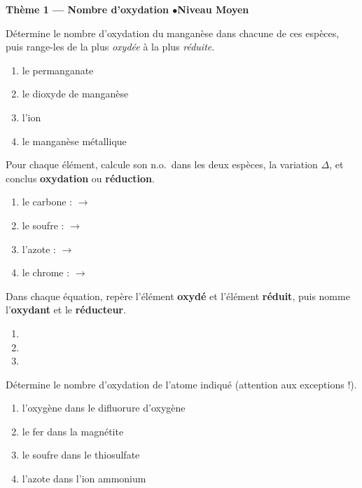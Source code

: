 \documentclass[11pt,a4paper]{article}
\begin{document}
\begin{center}\color{primarydark}\large\bfseries Thème 1 — Nombre d'oxydation \quad$\bullet$\quad Niveau Moyen\end{center}

\begin{exo}
Détermine le nombre d'oxydation du manganèse dans chacune de ces espèces, puis range-les de la plus
\emph{oxydée} à la plus \emph{réduite}.
\begin{enumerate}[label=\alph*)]
  \item le permanganate 
  \item le dioxyde de manganèse 
  \item l'ion 
  \item le manganèse métallique 
\end{enumerate}
\end{exo}

\begin{exo}
Pour chaque élément, calcule son n.o.\ dans les deux espèces, la variation $\Delta$, et conclus
\textbf{oxydation} ou \textbf{réduction}.
\begin{enumerate}[label=\alph*)]
  \item le carbone :  $\longrightarrow$ 
  \item le soufre :  $\longrightarrow$ 
  \item l'azote :  $\longrightarrow$ 
  \item le chrome :  $\longrightarrow$ 
\end{enumerate}
\end{exo}

\begin{exo}
Dans chaque équation, repère l'élément \textbf{oxydé} et l'élément \textbf{réduit}, puis nomme
l'\textbf{oxydant} et le \textbf{réducteur}.
\begin{enumerate}[label=\alph*)]
  \item {}
  \item {}
  \item {}
\end{enumerate}
\end{exo}

\begin{exo}
Détermine le nombre d'oxydation de l'atome indiqué (attention aux exceptions !).
\begin{enumerate}[label=\alph*)]
  \item l'oxygène dans le difluorure d'oxygène 
  \item le fer dans la magnétite 
  \item le soufre dans le thiosulfate 
  \item l'azote dans l'ion ammonium 
\end{enumerate}
\end{exo}
\end{document}
